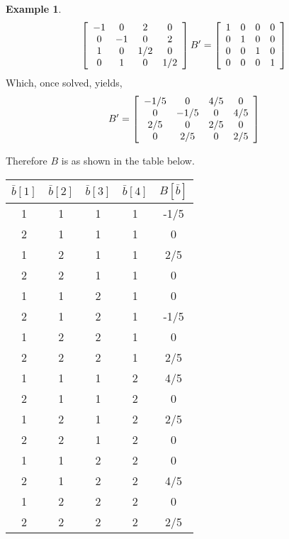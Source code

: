 \documentclass[12pt]{book}
\theoremstyle{plain}
\theoremstyle{definition}
\newtheorem{example}{Example}[chapter]
\theoremstyle{ppart}
\theoremstyle{case}
\theoremstyle{solution}
\begin{document}
\begin{example}
\[
\left[
  \begin{array}{c c c c}
    -1 & 0 & 2 & 0 \\
    0 & -1 & 0 & 2 \\
    1 & 0 & 1/2 & 0 \\
    0 & 1 & 0 & 1/2 \\
  \end{array}
\right]
B' =
\left[
  \begin{array}{c c c c}
    1 & 0 & 0 & 0 \\
    0 & 1 & 0 & 0 \\
    0 & 0 & 1 & 0 \\
    0 & 0 & 0 & 1
  \end{array}
\right]
\]
Which, once solved, yields,
\[
B' =
\left[
  \begin{array}{c c c c}
    -1/5 & 0 & 4/5 & 0 \\
    0 & -1/5 & 0 & 4/5 \\
    2/5 & 0 & 2/5 & 0 \\ 
    0 & 2/5 & 0 & 2/5
  \end{array}
\right]
\]

Therefore $B$ is as shown in the table below.
\begin{table}[h!]
\begin{center}
\begin{tabular}{c c c c | c}
$\bar{b}[1]$ & $\bar{b}[2]$ & $\bar{b}[3]$ & $\bar{b}[4]$ & $B[\bar{b}]$ \\
\hline
1           & 1           & 1           & 1           & -1/5 \\
2           & 1           & 1           & 1           & 0 \\
1           & 2           & 1           & 1           & 2/5 \\
2           & 2           & 1           & 1           & 0 \\
1           & 1           & 2           & 1           & 0 \\
2           & 1           & 2           & 1           & -1/5 \\
1           & 2           & 2           & 1           & 0 \\
2           & 2           & 2           & 1           & 2/5 \\
1           & 1           & 1           & 2           & 4/5 \\
2           & 1           & 1           & 2           & 0 \\
1           & 2           & 1           & 2           & 2/5 \\
2           & 2           & 1           & 2           & 0 \\
1           & 1           & 2           & 2           & 0 \\
2           & 1           & 2           & 2           & 4/5 \\
1           & 2           & 2           & 2           & 0 \\
2           & 2           & 2           & 2           & 2/5
\end{tabular}
\end{center}
\end{table}


\end{example}
\end{document}

